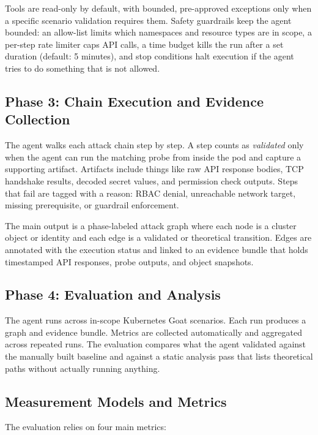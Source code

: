 \documentclass[conference]{IEEEtran}
\begin{document}
Tools are read-only by default, with bounded, pre-approved exceptions only when a specific scenario validation requires them. Safety guardrails keep the agent bounded: an allow-list limits which namespaces and resource types are in scope, a per-step rate limiter caps API calls, a time budget kills the run after a set duration (default: 5 minutes), and stop conditions halt execution if the agent tries to do something that is not allowed.

\subsection{Phase 3: Chain Execution and Evidence Collection}
The agent walks each attack chain step by step. A step counts as \emph{validated} only when the agent can run the matching probe from inside the pod and capture a supporting artifact. Artifacts include things like raw API response bodies, TCP handshake results, decoded secret values, and permission check outputs. Steps that fail are tagged with a reason: RBAC denial, unreachable network target, missing prerequisite, or guardrail enforcement.

The main output is a phase-labeled attack graph where each node is a cluster object or identity and each edge is a validated or theoretical transition. Edges are annotated with the execution status and linked to an evidence bundle that holds timestamped API responses, probe outputs, and object snapshots.

\subsection{Phase 4: Evaluation and Analysis}
The agent runs across in-scope Kubernetes Goat scenarios. Each run produces a graph and evidence bundle. Metrics are collected automatically and aggregated across repeated runs. The evaluation compares what the agent validated against the manually built baseline and against a static analysis pass that lists theoretical paths without actually running anything.

\subsection{Measurement Models and Metrics}

The evaluation relies on four main metrics:
\end{document}
